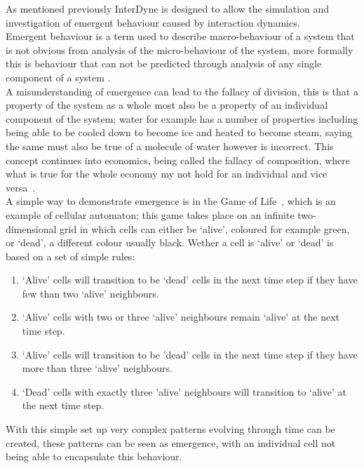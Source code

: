 \documentclass{article}
\begin{document}
As mentioned previously InterDyne is designed to allow the simulation and investigation of emergent behaviour caused by interaction dynamics.\\ 
Emergent behaviour is a term used to describe macro-behaviour of a system that is not obvious from analysis of the micro-behaviour of the system, more formally this is behaviour that can not be predicted through analysis of any single component of a system \cite{EB_systemofsystemsGLangford}.\\
A misunderstanding of emergence can lead to the fallacy of division, this is that a property of the system as a whole most also be a property of an individual component of the system; water for example has a number of properties including being able to be cooled down to become ice and heated to become steam, saying the same must also be true of a molecule of water however is incorrect. This concept continues into economics, being called the fallacy of composition, where what is true for the whole economy my not hold for an individual and vice versa~\cite{fallacyofcompostionBook}.\\       
A simple way to demonstrate emergence is in the Game of Life~\cite{gameoflifepage}, which is an example of cellular automaton; this game takes place on an infinite two-dimensional grid in which cells can either be `alive', coloured for example green, or `dead', a different colour usually black. Wether a cell is `alive' or `dead' is based on a set of simple rules:   
\begin{enumerate}
  \item `Alive' cells will transition to be `dead' cells in the next time step if they have few than two `alive' neighbours.
  \item `Alive' cells with two or three `alive' neighbours remain `alive' at the next time step.
  \item `Alive' cells will transition to be 'dead' cells in the next time step if they have more than three `alive' neighbours.
  \item `Dead' cells with exactly three 'alive' neighbours will transition to `alive' at the next time step.
\end{enumerate}
With this simple set up very complex patterns evolving through time can be created, these patterns can be seen as emergence, with an individual cell not being able to encapsulate this behaviour.\\
\end{document}
